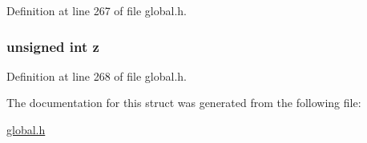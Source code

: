 Definition at line 267 of file global.\-h.

\hypertarget{structuintVector3d_a3d99b005d0fb73033dce14d4a135d01f}{
\subsubsection[{z}]{\setlength{\rightskip}{0pt plus 5cm}unsigned int z}}\label{structuintVector3d_a3d99b005d0fb73033dce14d4a135d01f}


Definition at line 268 of file global.\-h.



The documentation for this struct was generated from the following file\-:\begin{DoxyCompactItemize}
\item 
\hyperlink{global_8h}{global.\-h}\end{DoxyCompactItemize}
